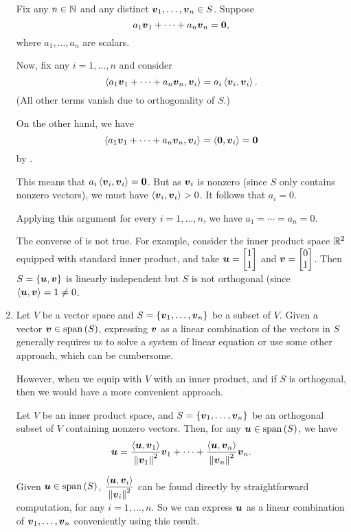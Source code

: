 \begin{enumerate}
\begin{pf}
Fix any \(n\in\mathbb{N}\) and any distinct \(\vb*{v}_1,\dotsc,\vb*{v}_n\in S\).
Suppose
\[
a_1\vb*{v}_1+\dotsb+a_n\vb*{v}_n=\vb*{0},
\]
where \(a_1,\dotsc,a_n\) are scalars.

Now, fix any \(i=1,\dotsc,n\) and consider
\[
\left\langle a_1\vb*{v}_1+\dotsb+a_n\vb*{v}_n,\vb*{v}_i\right\rangle=a_i\left\langle \vb*{v}_i,\vb*{v}_i\right\rangle.
\]
(All other terms vanish due to orthogonality of \(S\).)

On the other hand, we have
\[
\left\langle a_1\vb*{v}_1+\dotsb+a_n\vb*{v}_n,\vb*{v}_i\right\rangle
=\left\langle \vb*{0},\vb*{v}_i\right\rangle
=\vb*{0}
\]
by .

This means that \(a_i\left\langle \vb*{v}_i,\vb*{v}_i\right\rangle=\vb*{0}\). But as
\(\vb*{v}_i\) is nonzero (since \(S\) only contains nonzero vectors), we must
have \(\left\langle \vb*{v}_i,\vb*{v}_i\right\rangle>0\). It follows that \(a_i=0\).

Applying this argument for every \(i=1,\dotsc,n\), we have
\(a_1=\dotsb=a_n=0\).
\end{pf}

The converse of  is not true. For example, consider the
inner product space \(\mathbb{R}^2\) equipped with standard inner product, and take
\(\vect{u}=\mqty[1\\ 1]\) and \(\vect{v}=\mqty[0\\ 1]\). Then
\(S=\{\vb*{u},\vb*{v}\}\) is linearly independent but \(S\) is not orthogonal
(since \(\left\langle \vb*{u},\vb*{v}\right\rangle=1\ne 0\).

\item Let \(V\) be a vector space and \(S=\{\vb*{v}_1,\dotsc,\vb*{v}_n\}\) be
a subset of \(V\). Given a vector \(\vb*{v}\in \operatorname{span}\qty(S)\), expressing
\(\vb*{v}\) as a linear combination of the vectors in \(S\) generally requires
us to solve a system of linear equation or use some other approach, which can
be cumbersome.

However, when we equip with \(V\) with an inner product, and if \(S\) is
orthogonal, then we would have a more convenient approach.

\begin{theorem}
\label{thm:orthog-lin-comb}
Let \(V\) be an inner product space, and \(S=\{\vb*{v}_1,\dotsc,\vb*{v}_n\}\)
be an orthogonal subset of \(V\) containing nonzero vectors. Then, for any
\(\vb*{u}\in\operatorname{span}\qty(S)\), we have
\[
\vb*{u}=\frac{\left\langle \vb*{u},\vb*{v}_1\right\rangle}{\norm{\vb*{v}_1}^{2}}\vb*{v}_1
+\dotsb+\frac{\left\langle \vb*{u},\vb*{v}_n\right\rangle}{\norm{\vb*{v}_n}^{2}}\vb*{v}_n.
\]
\end{theorem}
\begin{note}
Given \(\vb*{u}\in\operatorname{span}\qty(S)\), \(\displaystyle
\frac{\left\langle \vb*{u},\vb*{v}_i\right\rangle}{\norm{\vb*{v}_i}^{2}}\) can be found
directly by straightforward computation, for any \(i=1,\dotsc,n\). So we can
express \(\vb*{u}\) as a linear combination of
\(\vb*{v}_1,\dotsc,\vb*{v}_n\) conveniently using this result.
\end{note}


\end{enumerate}
